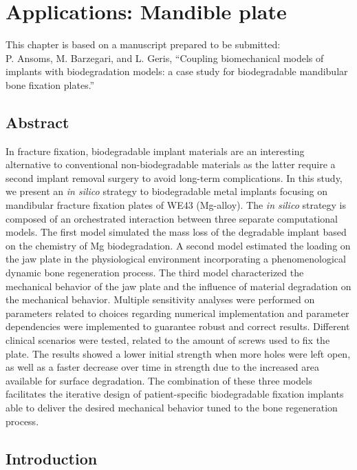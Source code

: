 \chapter{Applications: Mandible plate}\label{ch:mandible}

\begin{shaded}
This chapter is based on a manuscript prepared to be submitted:\\
P. Ansoms, M. Barzegari, and L. Geris, ``Coupling biomechanical models of implants with biodegradation models: a case study for biodegradable mandibular bone fixation plates.''
\end{shaded}

\section*{Abstract}

In fracture fixation, biodegradable implant materials are an interesting alternative to conventional non-biodegradable materials as the latter require a second implant removal surgery to avoid long-term complications. In this study, we present an \textit{in silico} strategy to biodegradable metal implants focusing on mandibular fracture fixation plates of WE43 (Mg-alloy). The \textit{in silico} strategy is composed of an orchestrated interaction between three separate computational models. The first model simulated the mass loss of the degradable implant based on the chemistry of Mg biodegradation. A second model estimated the loading on the jaw plate in the physiological environment incorporating a phenomenological dynamic bone regeneration process. The third model characterized the mechanical behavior of the jaw plate and the influence of material degradation on the mechanical behavior. Multiple sensitivity analyses were performed on parameters related to choices regarding numerical implementation and parameter dependencies were implemented to guarantee robust and correct results. Different clinical scenarios were tested, related to the amount of screws used to fix the plate. The results showed a lower initial strength when more holes were left open, as well as a faster decrease over time in strength due to the increased area available for surface degradation. The combination of these three models facilitates the iterative design of patient-specific biodegradable fixation implants able to deliver the desired mechanical behavior tuned to the bone regeneration process.

\section{Introduction}

